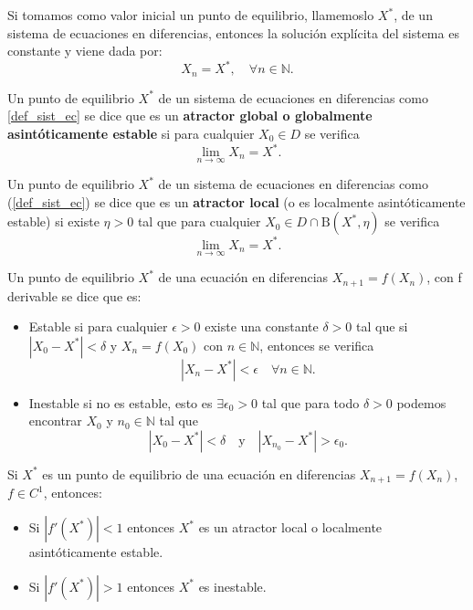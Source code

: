 \begin{proposition}
Si tomamos como valor inicial un punto de equilibrio, llamemoslo $X^*$, de un sistema de ecuaciones en diferencias, entonces la solución explícita del sistema es constante y viene dada por:
$$X_n = X^*, \quad \forall n\in\mathbb{N}.$$
\end{proposition}

\begin{definition}
Un punto de equilibrio $X^*$ de un sistema de ecuaciones en diferencias como \eqref{def_sist_ec} se dice que es un \textbf{atractor global o globalmente asintóticamente estable} si para cualquier $X_0\in D$ se verifica
$$\displaystyle\lim_{n\to \infty} X_n = X^*.$$
\end{definition}

\begin{definition}
Un punto de equilibrio $X^*$ de un sistema de ecuaciones en diferencias como (\ref{def_sist_ec}) se dice que es un \textbf{atractor local} (o es localmente asintóticamente estable) si existe $\eta>0$ tal que para cualquier $X_0\in D\cap \text{B}(X^*, \eta )$ se verifica
$$\displaystyle\lim_{n\to \infty} X_n = X^*.$$

\end{definition}

\begin{definition}
Un punto de equilibrio $X^*$ de una ecuación en diferencias $X_{n+1}=f(X_n)$, con f derivable se dice que es:
\begin{itemize}
\item Estable si para cualquier $\epsilon > 0$ existe una constante $\delta > 0$ tal que si $|X_0-X^*|<\delta$ y $X_n=f(X_0)$ con $n\in\mathbb{N}$, entonces se verifica
$$|X_n-X^*| < \epsilon \quad \forall n \in\mathbb{N}.$$
\item Inestable si no es estable, esto es $\exists \epsilon_0 >0$ tal que para todo $\delta >0$ podemos encontrar $X_0$ y $n_0\in\mathbb{N}$ tal que
$$|X_0-X^*|<\delta \quad \text{y} \quad |X_{n_0}-X^*|>\epsilon_0.$$
\end{itemize}
\end{definition}

\begin{proposition}
Si $X^*$ es un punto de equilibrio de una ecuación en diferencias $X_{n+1}=f(X_n)$, $f\in C^1$, entonces:
\begin{itemize}
\item Si $|f'(X^*)|<1$ entonces $X^*$ es un atractor local o localmente asintóticamente estable.
\item Si $|f'(X^*)|>1$ entonces $X^*$ es inestable.
\end{itemize}
\end{proposition}

